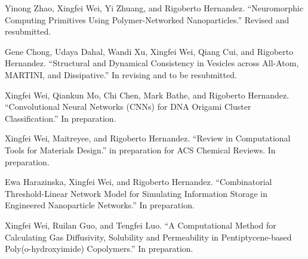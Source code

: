   \item {Yinong Zhao, Xingfei Wei, Yi Zhuang, and Rigoberto Hernandez. ``Neuromorphic Computing Primitives Using Polymer-Networked Nanoparticles.'' Revised and resubmitted.}
 \item {Gene Chong, Udaya Dahal, Wandi Xu, Xingfei Wei, Qiang Cui, and Rigoberto Hernandez. ``Structural and Dynamical Consistency in Vesicles across All-Atom, MARTINI, and Dissipative.'' In revising and to be resubmitted.}
  \item {Xingfei Wei, Qiankun Mo, Chi Chen, Mark Bathe, and Rigoberto Hernandez. ``Convolutional Neural Networks (CNNs) for DNA Origami Cluster Classification.'' In preparation.}
  \item {Xingfei Wei, Maitreyee, and Rigoberto Hernandez. ``Review in Computational Tools for Materials Design.'' in preparation for ACS Chemical Reviews. In preparation.}
  \item {Ewa Harazinska, Xingfei Wei, and Rigoberto Hernandez. ``Combinatorial Threshold-Linear Network Model for Simulating Information Storage in Engineered Nanoparticle Networks.'' In preparation.}
 \item {Xingfei Wei, Ruilan Guo, and Tengfei Luo. ``A Computational Method for Calculating Gas Diffusivity, Solubility and Permeability in Pentiptycene-based Poly(o-hydroxyimide) Copolymers.'' In preparation.}